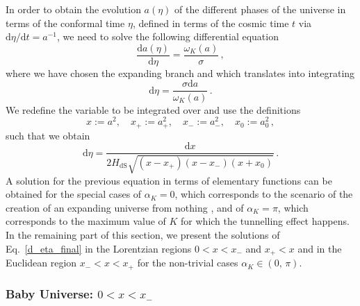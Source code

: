\documentclass[aps,nofootinbib,prd,superscriptaddress,eqsecnum,showpacs,showkeys,preprintnumbers,altaffilletter]{revtex4}
\def\D{\mathrm{d}}
\def\be{\begin{equation}}
\def\ee{\end{equation}}
\newcommand{\HdS}{H_\mathrm{dS}}
\begin{document}
In order to obtain the evolution $a(\eta)$ of the different phases of the universe in terms of the conformal time $\eta$, defined in terms of the cosmic time $t$ via $\D\eta/\D t = a^{-1}$, we need to solve the  following differential equation
\be
\frac{\D a(\eta)}{\D \eta} 
= \frac{\omega_K(a)}{\sigma }\,,
\ee
where we have chosen the expanding branch and which translates into integrating
\be
\D\eta = \frac{{ \sigma}\D a}{\omega_K(a)}\,. 
\ee
We redefine the variable to be integrated over and use the definitions
\be \label{defx}
x := a^2, \quad x_+ := a^2_+, \quad x_-:= a^2_-, \quad x_0 := a^2_0\,,
\ee
such that we obtain
\be \label{d_eta_final}
\D\eta = \frac{\D x}{2 \HdS \sqrt{(x - x_+)(x - x_-)(x + x_0)}}\,.
\ee
A solution for the previous equation in terms of elementary functions can be obtained for the special cases of $\alpha_K=0$, which corresponds to the scenario of the creation of an expanding universe from nothing \cite{Vilenkin:1984wp}, and of $\alpha_K=\pi$, which corresponds to the maximum value of $K$ for which the tunnelling effect happens. In the remaining part of this section, we present the solutions of Eq.~\eqref{d_eta_final} in the Lorentzian regions $0<x<x_-$ and $x_+<x$ and in the Euclidean region $x_-<x<x_+$ for the non-trivial cases $\alpha_K\in(0,\,\pi)$.

%
%

\subsubsection{Baby Universe: $0 < x < x_-$}
\end{document}
